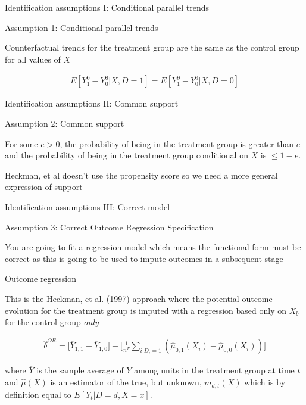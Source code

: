 \documentclass{beamer}
\begin{document}
\begin{frame}{Identification assumptions I: Conditional parallel trends}

Assumption 1: Conditional parallel trends

\bigskip

Counterfactual trends for the treatment group are the same as the control group for all values of $X$

\begin{eqnarray*}
E[Y_1^0 - Y_0^0 | X, D=1] = E[Y^0_1 - Y^0_0 | X, D=0]
\end{eqnarray*}

\end{frame}

\begin{frame}{Identification assumptions II: Common support}

Assumption 2: Common support

\bigskip

For some $e>0$, the probability of being in the treatment group is greater than $e$ and the probability of being in the treatment group conditional on $X$ is $\leq1-e$.

\bigskip

Heckman, et al doesn't use the propensity score so we need a more general expression of support

\end{frame}

\begin{frame}{Identification assumptions III: Correct model}

Assumption 3: Correct Outcome Regression Specification

\bigskip

You are going to fit a regression model which means the functional form must be correct as this is going to be used to impute outcomes in a subsequent stage

\end{frame}




\begin{frame}{Outcome regression}

This is the Heckman, et al. (1997) approach where the potential outcome evolution for the treatment group is imputed with a regression based only on $X_b$ for the control group \emph{only}

\bigskip

\begin{eqnarray*}
\widehat{\delta}^{OR} = \bigg [ \overline{Y}_{1,1} -  \overline{Y}_{1,0} \bigg ] -  \bigg [ \frac{1}{n^T} \sum_{i|D_i=1} ( \widehat{\mu}_{0,1}(X_i) - \widehat{\mu}_{0,0}(X_i)) \bigg ]
\end{eqnarray*}

where $\overline{Y}$ is the sample average of $Y$ among units in the treatment group at time $t$ and $\widehat{\mu}(X)$ is an estimator of the true, but unknown, $m_{d,t}(X)$ which is by definition equal to $E[Y_t|D=d,X=x]$.

\end{frame}
\end{document}
